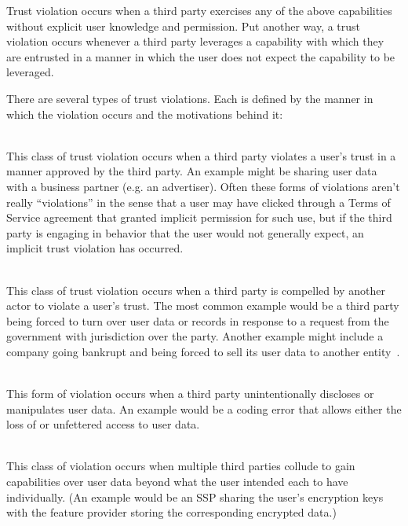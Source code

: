 Trust violation occurs when a third party exercises any of the above
capabilities without explicit user knowledge and permission. Put
another way, a trust violation occurs whenever a third party leverages
a capability with which they are entrusted in a manner in which the
user does not expect the capability to be leveraged.

There are several types of trust violations. Each is defined by the
manner in which the violation occurs and the motivations behind it:

\begin{packed_desc}
\item[Implicit (P):] \hfill \\ This class of trust violation occurs
  when a third party violates a user's trust in a manner approved by
  the third party. An example might be sharing user data with a
  business partner (e.g. an advertiser). Often these forms of
  violations aren't really ``violations'' in the sense that a user may
  have clicked through a Terms of Service agreement that granted
  implicit permission for such use, but if the third party is engaging
  in behavior that the user would not generally expect, an implicit
  trust violation has occurred.
\item[Compelled (C):] \hfill \\ This class of trust violation occurs
  when a third party is compelled by another actor to violate a user's
  trust. The most common example would be a third party being forced
  to turn over user data or records in response to a request from the
  government with jurisdiction over the party. Another example might
  include a company going bankrupt and being forced to sell its user
  data to another entity~\cite{solove2015}.
\item[Unintentional (U):] \hfill \\ This form of violation occurs when
  a third party unintentionally discloses or manipulates user data. An
  example would be a coding error that allows either the loss of or
  unfettered access to user data.
\item[Colluding (L):] \hfill \\ This class of violation occurs when
  multiple third parties collude to gain capabilities over user data
  beyond what the user intended each to have individually. (An example
  would be an SSP sharing the user's encryption keys with the feature
  provider storing the corresponding encrypted data.)
\end{packed_desc}
